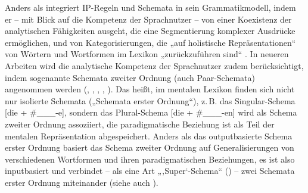 Anders als  integriert \citet{Köpcke1993} IP-Regeln und Schemata in sein Grammatikmodell, indem er -- mit Blick auf die Kompetenz der Sprachnutzer -- von einer Koexistenz der analytischen Fähigkeiten ausgeht, die eine Segmentierung komplexer Ausdrücke ermöglichen, und von Kategorisierungen, die „auf holistische Repräsentationen“ von Wörtern und Wortformen im Lexikon „zurückzuführen sind“ \citep[215]{Köpcke1993}. In neueren Arbeiten wird die analytische Kompetenz der Sprachnutzer zudem berücksichtigt, indem sogenannte Schemata zweiter Ordnung (auch Paar-Schemata) angenommen werden (\citealt{Nesset2008}, \citealt{KöpckeEtAl2021}, \citealt{KöpckeWecker2017}, \citealt{Ronneberger-Sibold2021}, \citealt{Wecker2016}). Das heißt, im mentalen Lexikon finden sich nicht nur isolierte Schemata („Schemata erster Ordnung“), z.\,B. das Singular-Schema [die + \#\_\_\_-e], sondern das Plural-Schema [die + \#\_\_\_-en] wird als Schema zweiter Ordnung assoziiert, die paradigmatische Beziehung ist als Teil der mentalen Repräsentation abgespeichert. Anders als das outputbasierte Schema erster Ordnung basiert das Schema zweiter Ordnung auf Generalisierungen von verschiedenen Wortformen und ihren paradigmatischen Beziehungen, es ist also inputbasiert und verbindet -- als eine Art „‚Super‘-Schema“ (\citealt[85]{KöpckeWecker2017}) -- zwei Schemata erster Ordnung miteinander (siehe auch ).

